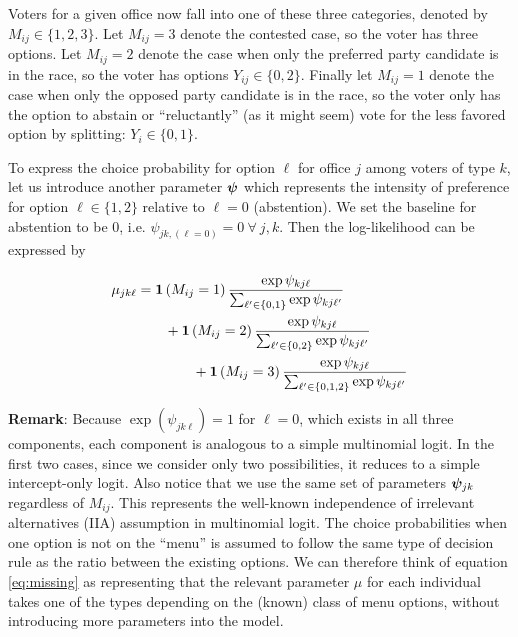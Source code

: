 \documentclass[11pt]{article}
\begin{document}
Voters for a given office now fall into one of these three categories, denoted by \(M_{ij} \in \{1, 2, 3\}\). Let \(M_{ij} = 3\) denote the contested case, so the voter has three options. Let \(M_{ij} = 2\) denote the case when only the preferred party candidate is in the race, so the voter has options \(Y_{ij} \in \{0, 2\}\). Finally let \(M_{ij} = 1\) denote the case when only the opposed party candidate is in the race, so the voter only has the option to abstain or ``reluctantly''  (as it might seem) vote for the less favored option by splitting: \(Y_{i} \in \{0, 1\}\).

To express the choice probability for option \(\ell\) for office \(j\) among voters of type \(k\), let us introduce another parameter \(\bm{\psi}\) which represents the intensity of preference for option \(\ell \in \{1, 2\}\) relative to \(\ell = 0\) (abstention). We set the baseline for abstention to be 0, i.e. \(\psi_{jk,(\ell=0)} = 0 ~\forall~ j, k\).  Then the log-likelihood can be expressed by 

\begin{align}
\mu_{jk\ell} &= \bm{1}\left(M_{ij}= 1\right)\frac{\exp{\psi_{kj\ell}}}{\sum_{\ell^\prime \in \{0, 1\}}\exp{\psi_{kj\ell^\prime}}}\nonumber \\
&\qquad +\bm{1}\left(M_{ij}= 2\right)\frac{\exp{\psi_{kj\ell}}}{\sum_{\ell^\prime \in \{0, 2\}}\exp{\psi_{kj\ell^\prime}}}\nonumber \\
&\qquad\qquad +\bm{1}\left(M_{ij}= 3\right)\frac{\exp{\psi_{kj\ell}}}{\sum_{\ell^\prime \in \{0, 1, 2\}}\exp{\psi_{kj\ell^\prime}}}\label{eq:missing}
\end{align}


\textbf{Remark}: Because \(\exp(\psi_{jk\ell}) = 1\) for \(\ell = 0\), which exists in all three components, each component is analogous to a simple multinomial logit. In the first two cases, since we consider only two possibilities, it reduces to a simple intercept-only logit. Also notice that we use the same set of parameters \(\bm{\psi}_{jk}\) regardless of \(M_{ij}\). This represents the well-known independence of irrelevant alternatives (IIA) assumption in multinomial logit. The choice probabilities when one option is not on the ``menu'' is assumed to follow the same type of decision rule as the ratio between the existing options.  We can therefore think of equation \ref{eq:missing} as representing that the relevant parameter \(\mu\) for each individual takes one of the types depending on the (known) class of menu options, without introducing more parameters into the model.
\end{document}
